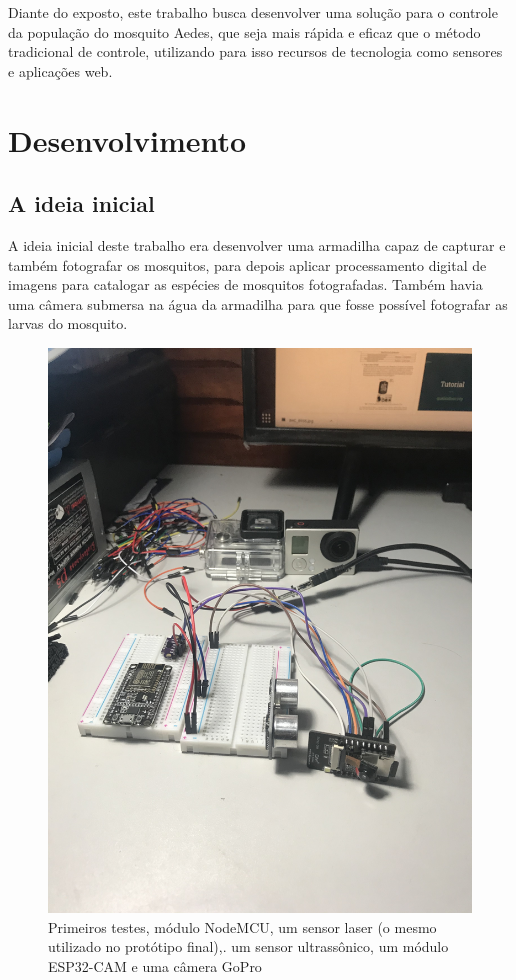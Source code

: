 \documentclass[
	12pt,				%
	openright,			%
	oneside,			%
	a4paper,			%
	chapter=TITLE,		%
	english,			%
	brazil				%
	]{abntex2}
\begin{document}
Diante do exposto, este trabalho busca desenvolver uma solução para o controle da
população do mosquito Aedes, que seja mais rápida e eficaz que o método tradicional de
controle, utilizando para isso recursos de tecnologia como sensores e aplicações web.

\chapter{Desenvolvimento}

\section{A ideia inicial}

A ideia inicial deste trabalho era desenvolver uma armadilha capaz de capturar e também fotografar os mosquitos, para depois aplicar processamento digital de 
imagens para catalogar as espécies de mosquitos fotografadas. Também havia uma câmera submersa na água da armadilha para que fosse possível 
fotografar as larvas do mosquito.

\begin{figure}[H]
    \centering
    \includegraphics[scale=0.09, angle=-90]{imagens/IMG_8989.jpg}
    \caption{Primeiros testes, módulo NodeMCU, um sensor laser (o mesmo utilizado no protótipo final),. 
    um sensor ultrassônico, um módulo ESP32-CAM e uma câmera GoPro}
        \label{fig:aprincipio}
    \end{figure}
\end{document}

